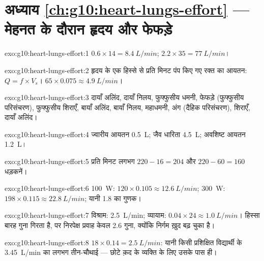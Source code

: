 \section*{अध्याय \ref{ch:g10:heart-lungs-effort} --- मेहनत के दौरान हृदय और फेफड़े}

\begin{solution}{exo:g10:heart-lungs-effort:1}
$0.6 \times 14 = \qty{8.4}{L/min}$; $2.2 \times 35 = \qty{77}{L/min}$।
\end{solution}

\begin{solution}{exo:g10:heart-lungs-effort:2}
हृदय के एक हिस्से से प्रति मिनट पंप किए गए रक्त का आयतन:
$Q = f \times V_s$। $65 \times 0.075 \approx \qty{4.9}{L/min}$।
\end{solution}

\begin{solution}{exo:g10:heart-lungs-effort:3}
दायाँ अलिंद, दायाँ निलय, फुफ्फुसीय धमनी, फेफड़े (फुफ्फुसीय परिसंचरण),
फुफ्फुसीय शिराएँ, बायाँ अलिंद, बायाँ निलय, महाधमनी, अंग (दैहिक
परिसंचरण), शिराएँ, दायाँ अलिंद।
\end{solution}

\begin{solution}{exo:g10:heart-lungs-effort:4}
ज्वारीय आयतन \qty{0.5}{L}; जैव धारिता \qty{4.5}{L}; अवशिष्ट आयतन
\qty{1.2}{L}।
\end{solution}

\begin{solution}{exo:g10:heart-lungs-effort:5}
प्रति मिनट लगभग $220 - 16 = 204$ और $220 - 60 = 160$ धड़कनें।
\end{solution}

\begin{solution}{exo:g10:heart-lungs-effort:6}
\qty{100}{W}: $120 \times 0.105 \approx \qty{12.6}{L/min}$;
\qty{300}{W}: $198 \times 0.115 \approx \qty{22.8}{L/min}$; यानी 1.8 का
गुणक।
\end{solution}

\begin{solution}{exo:g10:heart-lungs-effort:7}
विश्राम: \qty{2.5}{L/min}; व्यायाम: $0.04 \times 24 \approx
\qty{1.0}{L/min}$। हिस्सा बारह गुना गिरता है, पर निरपेक्ष प्रवाह केवल
2.6 गुना, क्योंकि निर्गम ख़ुद बढ़ चुका है।
\end{solution}

\begin{solution}{exo:g10:heart-lungs-effort:8}
$18 \times 0.14 = \qty{2.5}{L/min}$: यानी किसी प्रशिक्षित विद्यार्थी के
\qty{3.45}{L/min} का लगभग तीन-चौथाई --- छोटे क़द के व्यक्ति के लिए उसके
पास ही।
\end{solution}

